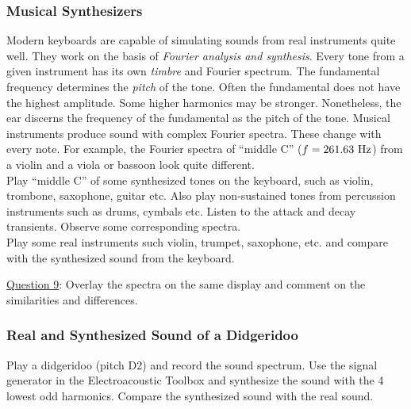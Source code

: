 \documentclass[11pt]{NSF}
\begin{document}
\subsubsection{Musical Synthesizers}

Modern keyboards are capable of simulating sounds from real 
instruments quite well. 
They work on the basis of {\em Fourier analysis and synthesis}. 
Every tone from a given instrument has its own {\em timbre} 
and Fourier spectrum. 
The fundamental frequency determines the {\em pitch} of the tone. 
Often the fundamental does not have the highest amplitude. 
Some higher harmonics may be stronger. 
Nonetheless, the ear discerns the frequency of the fundamental 
as the pitch of the tone. 
Musical instruments produce sound with complex Fourier spectra. 
These change with every note. 
For example, the Fourier spectra of ``middle C” ($f = 261.63~{\rm Hz}$) 
from a violin and a viola or bassoon look quite different. \\

Play “middle C” of some synthesized tones on the keyboard, such as violin, trombone,
saxophone, guitar etc. Also play non-sustained tones from percussion instruments such as drums,
cymbals etc. Listen to the attack and decay transients. Observe some corresponding spectra. \\

Play some real instruments such violin, trumpet, saxophone, etc. and compare with the
synthesized sound from the keyboard. 

\underline{Question 9}: Overlay the spectra on the same display and comment on the similarities and differences.

\subsubsection{Real and Synthesized Sound of a Didgeridoo}

Play a didgeridoo (pitch D2) and record the sound spectrum. Use the signal generator in the
Electroacoustic Toolbox and synthesize the sound with the 4 lowest odd harmonics. Compare the
synthesized sound with the real sound. \\
\end{document}
